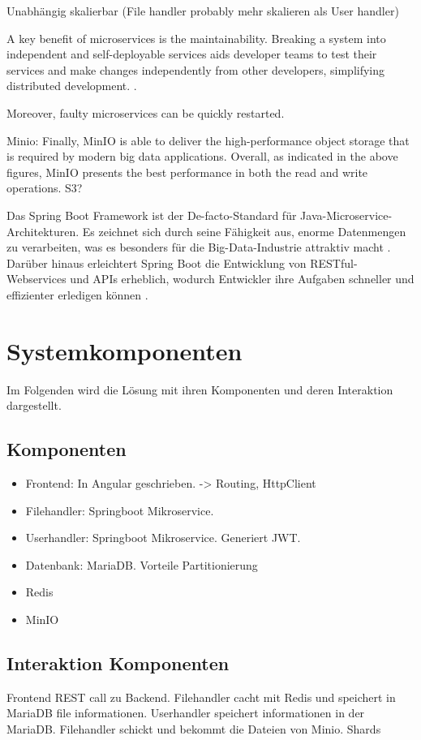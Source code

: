 \documentclass[12pt]{report}
\begin{document}
			Unabhängig skalierbar (File handler probably mehr skalieren als User handler)
			
			A key benefit of microservices is the maintainability. Breaking a system into independent and self-deployable services aids developer teams to test their services and make changes independently from other developers, simplifying distributed development. \cite{de2019monolithic}.
			
			Moreover, faulty microservices can be quickly restarted.  \cite{taibi2017processes}
			
			Minio:
			Finally, MinIO is able to deliver the high-performance object storage that is required by modern big data applications. \cite{makris2022performance}
			Overall, as indicated in the above figures, MinIO presents the best performance in both the read and write operations. \cite{makris2022performance}
			S3?
			
			Das Spring Boot Framework ist der De-facto-Standard für Java-Microservice-Architekturen. Es zeichnet sich durch seine Fähigkeit aus, enorme Datenmengen zu verarbeiten, was es besonders für die Big-Data-Industrie attraktiv macht \cite{mythily2022analysis}. Darüber hinaus erleichtert Spring Boot die Entwicklung von RESTful-Webservices und APIs erheblich, wodurch Entwickler ihre Aufgaben schneller und effizienter erledigen können \cite{mythily2022analysis}.
			
	\section{Systemkomponenten}
		Im Folgenden wird die Lösung mit ihren Komponenten und deren Interaktion dargestellt.
		\subsection{Komponenten}
			\begin{itemize}
				\item Frontend: In Angular geschrieben. -> Routing, HttpClient
				\item Filehandler: Springboot Mikroservice.
				\item Userhandler: Springboot Mikroservice. Generiert JWT.
				\item Datenbank: MariaDB. Vorteile Partitionierung
				\item Redis
				\item MinIO
			\end{itemize}
		\subsection{Interaktion Komponenten}
			Frontend REST call zu Backend.
			Filehandler cacht mit Redis und speichert in MariaDB file informationen.
			Userhandler speichert informationen in der MariaDB.
			Filehandler schickt und bekommt die Dateien von Minio. Shards
		
\end{document}
